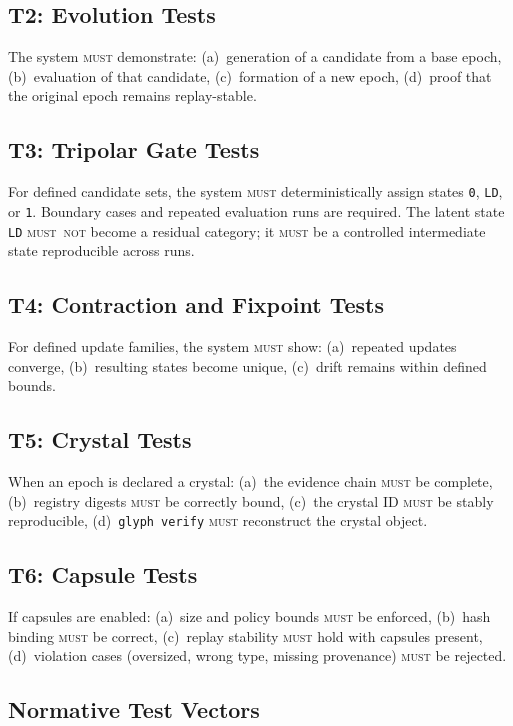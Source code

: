 \documentclass[11pt,a4paper,twoside]{article}
\theoremstyle{definition}
\theoremstyle{remark}
\newcommand{\must}{\textsc{must}}
\newcommand{\mustnot}{\textsc{must~not}}
\begin{document}
\subsection{T2: Evolution Tests}

The system \must{} demonstrate: (a)~generation of a candidate from a base epoch, (b)~evaluation of that candidate, (c)~formation of a new epoch, (d)~proof that the original epoch remains replay-stable.

\subsection{T3: Tripolar Gate Tests}

For defined candidate sets, the system \must{} deterministically assign states \texttt{0}, \texttt{LD}, or \texttt{1}. Boundary cases and repeated evaluation runs are required. The latent state \texttt{LD} \mustnot{} become a residual category; it \must{} be a controlled intermediate state reproducible across runs.

\subsection{T4: Contraction and Fixpoint Tests}

For defined update families, the system \must{} show: (a)~repeated updates converge, (b)~resulting states become unique, (c)~drift remains within defined bounds.

\subsection{T5: Crystal Tests}

When an epoch is declared a crystal: (a)~the evidence chain \must{} be complete, (b)~registry digests \must{} be correctly bound, (c)~the crystal ID \must{} be stably reproducible, (d)~\texttt{glyph verify} \must{} reconstruct the crystal object.

\subsection{T6: Capsule Tests}

If capsules are enabled: (a)~size and policy bounds \must{} be enforced, (b)~hash binding \must{} be correct, (c)~replay stability \must{} hold with capsules present, (d)~violation cases (oversized, wrong type, missing provenance) \must{} be rejected.

\subsection{Normative Test Vectors}
\end{document}
